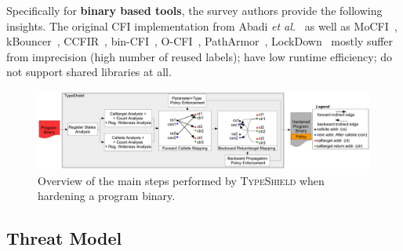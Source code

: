 Specifically for \textbf{binary based tools}, the survey authors provide the following insights. The original CFI implementation 
from Abadi \textit{et al.}~\cite{abadi:cfi2} as well as MoCFI~\cite{mocfi}, 
kBouncer~\cite{kbouncer}, 
CCFIR~\cite{ccfir:zhang}, bin-CFI~\cite{mingwei:sekar}, O-CFI~\cite{mohan:opaque}, 
PathArmor~\cite{veen:cfi}, 
LockDown~\cite{payer:dimva} mostly suffer from imprecision (high number of reused labels); 
have low runtime efficiency; do not support shared libraries at all.

% 

\begin{center}
\begin{figure}[t!]
\centering
   \includegraphics[width=.82\textwidth]{figures/overview.pdf}
   \vspace{-.25cm}
    \caption{Overview of the main steps performed by \textsc{TypeShield} when hardening a program binary.}
    \label{System overview.}
    \vspace{-.5cm}
 \end{figure}
\end{center}
    \vspace{-.5cm}
\subsection{Threat Model}
\label{Adversary Model}

